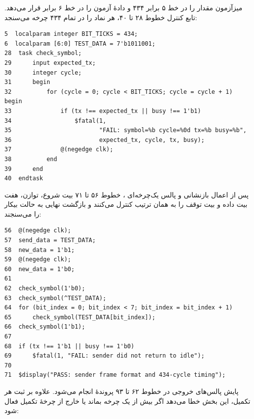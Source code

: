 
میزآزمون  مقدار  را در خط ۵ برابر ۴۳۴
و دادهٔ آزمون را در خط ۶ برابر  قرار می‌دهد. تابع کنترل خطوط ۲۸ تا ۴۰،
هر نماد را در تمام ۴۳۴ چرخه می‌سنجد:

\begin{dsdlcodeblock}
\begin{verbatim}
5  localparam integer BIT_TICKS = 434;
6  localparam [6:0] TEST_DATA = 7'b1011001;
28  task check_symbol;
29      input expected_tx;
30      integer cycle;
31      begin
32          for (cycle = 0; cycle < BIT_TICKS; cycle = cycle + 1) begin
33              if (tx !== expected_tx || busy !== 1'b1)
34                  $fatal(1,
35                         "FAIL: symbol=%b cycle=%0d tx=%b busy=%b",
36                         expected_tx, cycle, tx, busy);
37              @(negedge clk);
38          end
39      end
40  endtask
\end{verbatim}
\end{dsdlcodeblock}

پس از اعمال بازنشانی و پالس یک‌چرخه‌ای ، خطوط ۵۶ تا ۷۱ بیت شروع، توازن،
هفت بیت داده و بیت توقف را به همان ترتیب کنترل می‌کنند و بازگشت نهایی به حالت بیکار را
می‌سنجند:

\begin{dsdlcodeblock}
\begin{verbatim}
56  @(negedge clk);
57  send_data = TEST_DATA;
58  new_data = 1'b1;
59  @(negedge clk);
60  new_data = 1'b0;
61
62  check_symbol(1'b0);
63  check_symbol(^TEST_DATA);
64  for (bit_index = 0; bit_index < 7; bit_index = bit_index + 1)
65      check_symbol(TEST_DATA[bit_index]);
66  check_symbol(1'b1);
67
68  if (tx !== 1'b1 || busy !== 1'b0)
69      $fatal(1, "FAIL: sender did not return to idle");
70
71  $display("PASS: sender frame format and 434-cycle timing");
\end{verbatim}
\end{dsdlcodeblock}

پایش پالس‌های خروجی در خطوط ۶۲ تا ۹۳ پروندهٔ  انجام می‌شود. علاوه بر ثبت
هر تکمیل، این بخش خطا می‌دهد اگر  بیش از یک چرخه بماند یا
 خارج از چرخهٔ تکمیل فعال شود:

